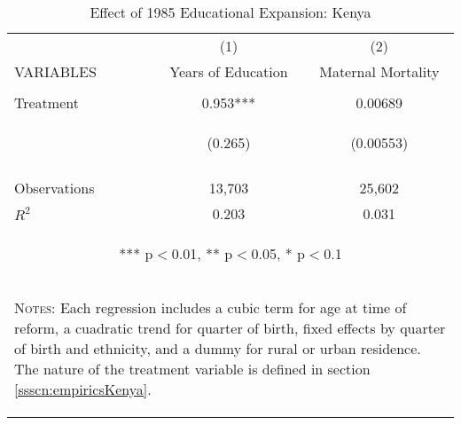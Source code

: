 \begin{subtables}
\begin{table}[htpb!]					
\begin{center}					
\begin{tabular}{p{3cm}cc}	\toprule				
	&	(1)	&	(2)	\\
VARIABLES	&	Years of Education	&	Maternal Mortality	\\ \midrule
\vspace{4pt}	&	\begin{footnotesize}\end{footnotesize}	&	\begin{footnotesize}\end{footnotesize}	 \\
Treatment	&	0.953***	&	0.00689	\\
	& \begin{footnotesize}	(0.265)	\end{footnotesize} & \begin{footnotesize}	(0.00553)	\end{footnotesize} \\
\vspace{4pt}	&	\begin{footnotesize}\end{footnotesize}	&	\begin{footnotesize}\end{footnotesize}	 \\
Observations	&	13,703	&	25,602	\\
$R^2$	&	0.203	&	0.031	\\ \midrule
\multicolumn{3}{c}{\begin{footnotesize} *** p$<$0.01, ** p$<$0.05, * p$<$0.1\end{footnotesize}} \\					
\multicolumn{3}{p{9.6cm}}{\begin{footnotesize}\textsc{Notes:} Each regression includes a cubic term for age at time of reform, a cuadratic trend for quarter of birth, fixed effects by quarter of birth and ethnicity, and a dummy for rural or urban residence.  The nature of the treatment variable is defined in section \ref{ssscn:empiricsKenya}.\end{footnotesize}} \\					
\bottomrule					
\end{tabular}					
\caption{Effect of 1985 Educational Expansion: Kenya}					
\vspace{-6mm}					
\label{tab:Kenya}					
\end{center}					
\end{table}					
\end{subtables}

